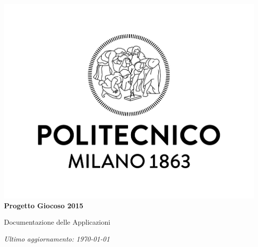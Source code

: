 \begin{titlepage}
\begin{center}
\includegraphics[width=\textwidth]{polimi_logo.jpg}
\Huge
\textbf{Progetto Giocoso 2015}

Documentazione delle Applicazioni

\vspace{5cm}
\normalsize
\textit{Ultimo aggiornamento: \today}
\end{center}
\end{titlepage}
